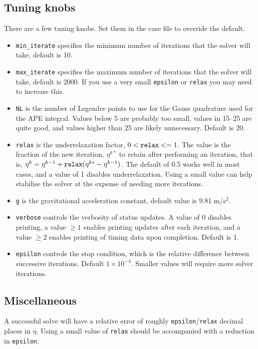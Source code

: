 \documentclass[letterpaper]{article}
\begin{document}
\subsection{Tuning knobs}
There are a few tuning knobs. Set them in the case file to override the default.
\begin{itemize}
 \item \verb+min_iterate+ specifies the minimum number of iterations that the solver will take, default is 10.
 \item \verb+max_iterate+ specifies the maximum number of iterations that the solver will take, default is 2000. If you use a very small \verb+epsilon+ or \verb+relax+ you may need to increase this. 
 \item \verb+NL+ is the number of Legendre points to use for the Gauss quadrature used for the APE integral. Values below 5 are probably too small, values in 15--25 are quite good, and values higher than 25 are likely unnecessary. Default is 20.
 \item \verb+relax+ is the underrelaxation factor, $0 < \verb+relax+ <= 1$.
        The value is the fraction of the new iteration, $\eta^{k*}$ to retain
        after performing an iteration, that is,
        $\eta^k = \eta^{k-1} + \verb+relax+(\eta^{k*} - \eta^{k-1})$.
        The default of 0.5 works well in most cases, and a value of 1 disables underrelaxation.
        Using a small value can help stabilise the solver at the expense of needing more iterations.
 \item \verb+g+ is the gravitational acceleration constant, default value is 9.81 m/s$^2$.
 \item \verb+verbose+ controls the verbosity of status updates. A value of 0 disables printing, a value $\ge 1$ enables printing updates after each iteration, and a value $\ge 2$ enables printing of timing data upon completion. Default is 1.
\item \verb+epsilon+ controls the stop condition, which is the relative difference between successive iterations. Default $1\times10^{-4}$. Smaller values will require more solver iterations.
\end{itemize}

\subsection{Miscellaneous}

A successful solve will have a relative error of roughly \verb+epsilon+/\verb+relax+ decimal places in $\eta$. Using a small value of \verb+relax+ should be accompanied with a reduction in \verb+epsilon+.
\end{document}
